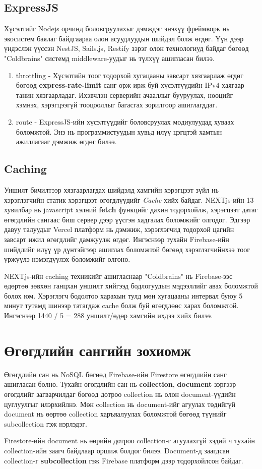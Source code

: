 \subsection{ExpressJS}
Хүсэлтийг Nodejs орчинд боловсруулахыг дэмждэг энэхүү фреймворк нь экосистем баялаг байдгаараа олон асуудлуудын шийдэл болж өгдөг. Үүн дээр үндэслэн үүссэн NestJS, Sails.js, Restify зэрэг олон технологиуд байдаг бөгөөд "Coldbrains" системд middleware-уудыг нь түлхүү ашигласан билээ. 
\begin{enumerate}
  \item throttling - Хүсэлтийн тоог тодорхой хугацааны завсарт хязгаарлаж өгдөг бөгөөд \textbf{express-rate-limit} санг орж ирж буй хүсэлтүүдийн IPv4 хаягаар танин хязгаарладаг. Ихэвчлэн серверийн ачааллыг бууруулах, нөөцийг хэмнэх, хэрэгцээгүй тооцооллыг багасгах зорилгоор ашиглагддаг. 
  \item route - ExpressJS-ийн хүсэлтүүдийг боловсруулах модиулуудад хуваах боломжтой. Энэ нь программистуудын хувьд илүү цэгцтэй хамтын ажиллагааг дэмжиж өгдөг билээ.
\end{enumerate}

\subsection{Caching}
Уншилт бичилтээр хязгаарлагдах шийдэлд хамгийн хэрэгцээт зүйл нь хэрэглэгчийн статик хэрэгцээт өгөгдлүүдийг \textit{Cache} хийх байдаг. NEXTjs-ийн 13 хувилбар нь javascript хэлний \textbf{fetch} функцийг дахин тодорхойлж, хэрэгцээт датаг өгөгдлийн сангаас биш сервер дээр үүсгэн хадгалах боломжийг олгодог. Эдгээр давуу талуудыг Vercel платформ нь дэмжиж, хэрэглэгчид тодорхой цагийн завсарт ижил өгөгдлийг дамжуулж өгдөг. Ингэснээр тухайн Firebase-ийн шийдлийг илүү үр дүнтэйгээр ашиглах боломжтой бөгөөд хэрэглэгчийнхээ тоог үржүүлэ нэмэгдүүлэх боломжийг олгоно. 

NEXTjs-ийн caching техникийг ашигласнаар "Coldbrains" нь Firebase-ээс өдөртөө зөвхөн ганцхан уншилт хийгээд бодлогуудын мэдээллийг авах боломжтой болох юм. Хэрэглэгч бодолтоо харахын тулд мөн хугацааны интервал буюу 5 минут тутамд шинээр татагдаж cache болж буй өгөгдлөөс харах боломжтой. Ингэснээр 1440 / 5 = 288 уншилт/өдөр хамгийн ихдээ хийх билээ.

\section{Өгөгдлийн сангийн зохиомж}
Өгөгдлийн сан нь NoSQL бөгөөд Firebase-ийн Firestore өгөгдлийн санг ашигласан болно. Тухайн өгөгдлийн сан нь \textbf{collection}, \textbf{document} зэргээр өгөгдлийг загварчилдаг бөгөөд дотроо collection нь олон document-үүдийн цуглуулгыг илэрхийлнэ. Мөн collection нь document-ийг агуулах төдийгүй document нь өөртөө collection харъяалуулах боломжтой бөгөөд түүнийг subcollection гэж нэрлэдэг. 

Firestore-ийн document нь өөрийн дотроо collection-г агуулахгүй хэдий ч тухайн collection-ийн заагч байдлаар оршиж болдог билээ. Document-д заагдсан collection-г \textbf{subcollection} гэж Firebase платформ дээр тодорхойлсон байдаг\cite{datamodeling}.

\clearpage
